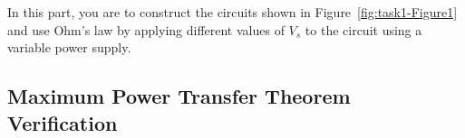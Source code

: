 In this part, you are to construct the circuits shown in Figure~\ref{fig:task1-Figure1} and use Ohm's law by applying different values of $V_s$ to the circuit using a variable power supply. 

    
    

    
    

\subsection{Maximum Power Transfer Theorem Verification}
\label{sec:maximumPowerTransferTheorem}

